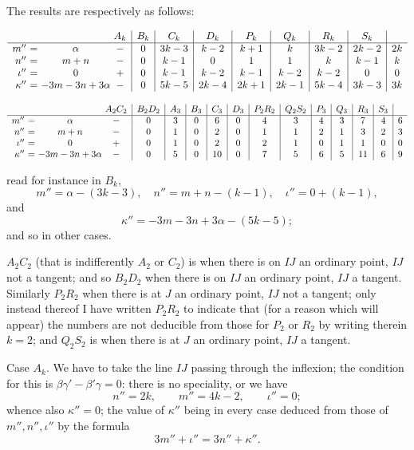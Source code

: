 ﻿\documentclass[11pt,a4paper]{article}
\theoremstyle{plain}
\theoremstyle{definition}
\begin{document}
The results are respectively as follows:
\begin{center}
\scriptsize
\(\begin{array}{r@{\ }c@{\ }c@{\ }c|c|c|c|c|c|c|c|c}
&&&A_k&B_k&C_k&D_k&P_k&Q_k&R_k&S_k\\ \hline
m''&=&\alpha&-&0&3k-3&k-2&k+1&k&3k-2&2k-2&2k\\
n''&=&m+n&-&0&k-1&0&1&1&k&k-1&k\\
\iota''&=&0&+&0&k-1&k-2&k-1&k-2&k-2&0&0\\
\kappa''&=&-3m-3n+3\alpha&-&0&5k-5&2k-4&2k+1&2k-1&5k-4&3k-3&3k
\end{array}\)
\end{center}
\begin{center}
\scriptsize
\(\begin{array}{r@{\ }c@{\ }c@{\ }c|c|c|c|c|c|c|c|c|c|c|c|c}
&&&A_2C_2&B_2D_2&A_3&B_3&C_3&D_3&P_2R_2&Q_2S_2&P_3&Q_3&R_3&S_3\\ \hline
m''&=&\alpha&-&0&3&0&6&0&4&3&4&3&7&4&6\\
n''&=&m+n&-&0&1&0&2&0&1&1&2&1&3&2&3\\
\iota''&=&0&+&0&1&0&2&0&2&1&0&1&1&0&0\\
\kappa''&=&-3m-3n+3\alpha&-&0&5&0&10&0&7&5&6&5&11&6&9
\end{array}\)
\end{center}
read for instance in \(B_k\),
\[
m''=\alpha-(3k-3),\quad n''=m+n-(k-1),\quad
\iota''=0+(k-1),
\]
and
\[
\kappa''=-3m-3n+3\alpha-(5k-5);
\]
and so in other cases.

\(A_2C_2\) (that is indifferently \(A_2\) or \(C_2\)) is when there is on
\(IJ\) an ordinary point, \(IJ\) not a tangent; and so \(B_2D_2\) when
there is on \(IJ\) an ordinary point, \(IJ\) a tangent. Similarly
\(P_2R_2\) when there is at \(J\) an ordinary point, \(IJ\) not a tangent;
only instead thereof I have written \(P_2R_2\) to indicate that (for a
reason which will appear) the numbers are not deducible from those for
\(P_2\) or \(R_2\) by writing therein \(k=2\); and \(Q_2S_2\) is when
there is at \(J\) an ordinary point, \(IJ\) a tangent.

Case \(A_k\). We have to take the line \(IJ\) passing through the
inflexion; the condition for this is \(\beta\gamma'-\beta'\gamma=0\):
there is no speciality, or we have
\[
n''=2k,\qquad m''=4k-2,\qquad \iota''=0;
\]
whence also \(\kappa''=0\); the value of \(\kappa''\) being in every case
deduced from those of \(m'',n'',\iota''\) by the formula
\[
3m''+\iota''=3n''+\kappa''.
\]
\end{document}

